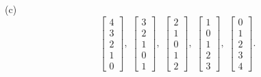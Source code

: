 \documentclass[12pt]{article}
\begin{document}
(c)
\begin{equation*}
    \begin{bmatrix}
    4\\3\\2\\1\\0
    \end{bmatrix} , \;
    \begin{bmatrix}
    3\\2\\1\\0\\1
    \end{bmatrix} , \;
    \begin{bmatrix}
    2\\1\\0\\1\\2
    \end{bmatrix} , \;
    \begin{bmatrix}
    1\\0\\1\\2\\3
    \end{bmatrix} , \;
    \begin{bmatrix}
    0\\1\\2\\3\\4
    \end{bmatrix} .
\end{equation*}
\end{document}
